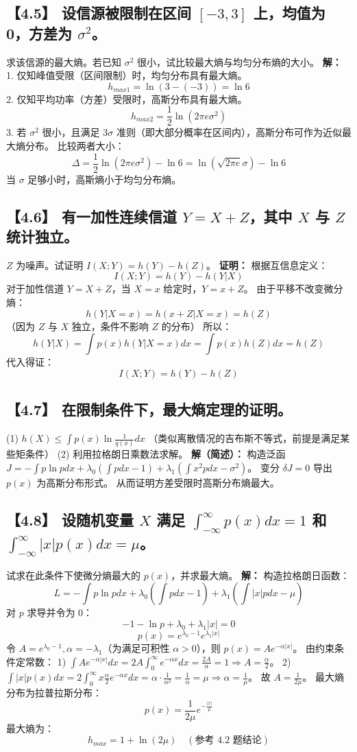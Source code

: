 \documentclass[11pt, a4paper]{article}
\begin{document}
\subsection*{【4.5】 设信源被限制在区间 $[-3, 3]$ 上，均值为 0，方差为 $\sigma^2$。}
求该信源的最大熵。若已知 $\sigma^2$ 很小，试比较最大熵与均匀分布熵的大小。
\textbf{解：}
1. 仅知峰值受限（区间限制）时，均匀分布具有最大熵。
\[ h_{max1} = \ln(3 - (-3)) = \ln 6 \]
2. 仅知平均功率（方差）受限时，高斯分布具有最大熵。
\[ h_{max2} = \frac{1}{2} \ln(2\pi e \sigma^2) \]
3. 若 $\sigma^2$ 很小，且满足 $3\sigma$ 准则（即大部分概率在区间内），高斯分布可作为近似最大熵分布。
比较两者大小：
\[ \Delta = \frac{1}{2} \ln(2\pi e \sigma^2) - \ln 6 = \ln(\sqrt{2\pi e} \sigma) - \ln 6 \]
当 $\sigma$ 足够小时，高斯熵小于均匀分布熵。

\subsection*{【4.6】 有一加性连续信道 $Y = X + Z$，其中 $X$ 与 $Z$ 统计独立。}
$Z$ 为噪声。试证明 $I(X;Y) = h(Y) - h(Z)$。
\textbf{证明：}
根据互信息定义：
\[ I(X;Y) = h(Y) - h(Y|X) \]
对于加性信道 $Y = X + Z$，当 $X=x$ 给定时，$Y = x + Z$。
由于平移不改变微分熵：
\[ h(Y|X=x) = h(x+Z|X=x) = h(Z) \]
（因为 $Z$ 与 $X$ 独立，条件不影响 $Z$ 的分布）
所以：
\[ h(Y|X) = \int p(x) h(Y|X=x) dx = \int p(x) h(Z) dx = h(Z) \]
代入得证：
\[ I(X;Y) = h(Y) - h(Z) \]

\subsection*{【4.7】 在限制条件下，最大熵定理的证明。}
(1) $h(X) \le \int p(x) \ln \frac{1}{q(x)} dx$ （类似离散情况的吉布斯不等式，前提是满足某些矩条件）
(2) 利用拉格朗日乘数法求解。
\textbf{解（简述）：}
构造泛函 $J = - \int p \ln p dx + \lambda_0 (\int p dx - 1) + \lambda_1 (\int x^2 p dx - \sigma^2)$。
变分 $\delta J = 0$ 导出 $p(x)$ 为高斯分布形式。
从而证明方差受限时高斯分布熵最大。

\subsection*{【4.8】 设随机变量 $X$ 满足 $\int_{-\infty}^{\infty} p(x)dx = 1$ 和 $\int_{-\infty}^{\infty} |x|p(x)dx = \mu$。}
试求在此条件下使微分熵最大的 $p(x)$，并求最大熵。
\textbf{解：}
构造拉格朗日函数：
\[ L = - \int p \ln p dx + \lambda_0 (\int p dx - 1) + \lambda_1 (\int |x| p dx - \mu) \]
对 $p$ 求导并令为 0：
\[ -1 - \ln p + \lambda_0 + \lambda_1 |x| = 0 \]
\[ p(x) = e^{\lambda_0 - 1} e^{\lambda_1 |x|} \]
令 $A = e^{\lambda_0 - 1}, \alpha = -\lambda_1$（为满足可积性 $\alpha > 0$），则 $p(x) = A e^{-\alpha |x|}$。
由约束条件定常数：
1) $\int A e^{-\alpha |x|} dx = 2A \int_0^\infty e^{-\alpha x} dx = \frac{2A}{\alpha} = 1 \Rightarrow A = \frac{\alpha}{2}$。
2) $\int |x| p(x) dx = 2 \int_0^\infty x \frac{\alpha}{2} e^{-\alpha x} dx = \alpha \cdot \frac{1}{\alpha^2} = \frac{1}{\alpha} = \mu \Rightarrow \alpha = \frac{1}{\mu}$。
故 $A = \frac{1}{2\mu}$。
最大熵分布为拉普拉斯分布：
\[ p(x) = \frac{1}{2\mu} e^{-\frac{|x|}{\mu}} \]
最大熵为：
\[ h_{max} = 1 + \ln(2\mu) \quad (\text{参考 4.2 题结论}) \]
\end{document}
